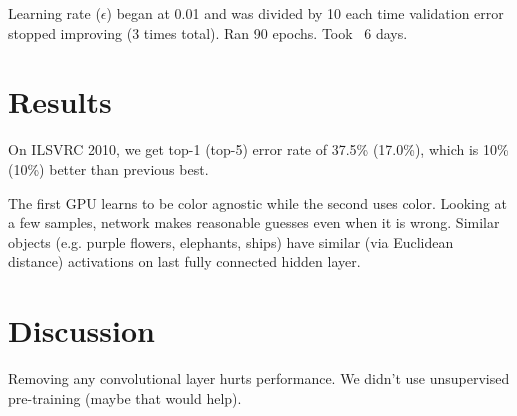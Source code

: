 \documentclass[a4paper]{article}
\begin{document}
Learning rate ($\epsilon$) began at 0.01 and was divided by 10 each time
validation error stopped improving (3 times total). Ran 90 epochs. Took ~6 days.

\section{Results}
On ILSVRC 2010, we get top-1 (top-5) error rate of 37.5\% (17.0\%), which is
10\% (10\%) better than previous best.

The first GPU learns to be color agnostic while the second uses color. Looking
at a few samples, network makes reasonable guesses even when it is wrong.
Similar objects (e.g. purple flowers, elephants, ships) have similar (via
Euclidean distance) activations on last fully connected hidden layer.

\section{Discussion}

Removing any convolutional layer hurts performance. We didn't use unsupervised
pre-training (maybe that would help).
\end{document}
